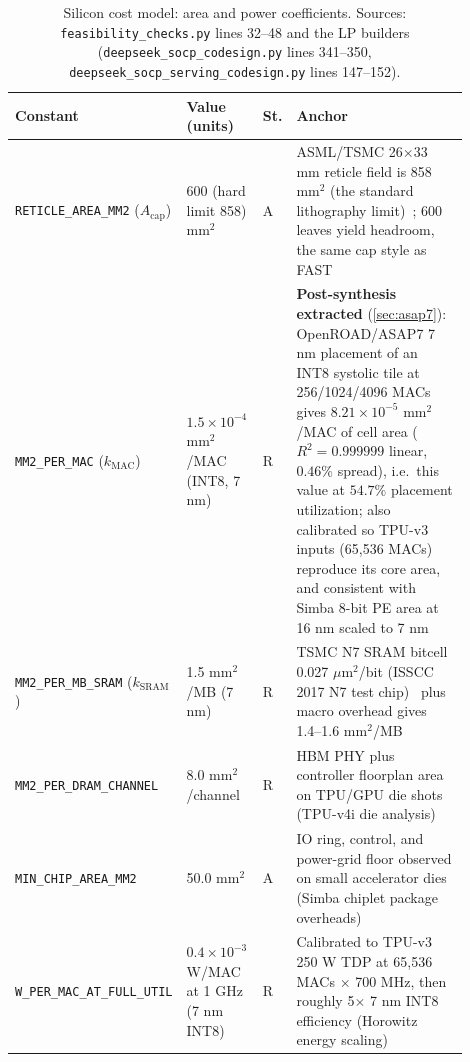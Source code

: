 \begin{table}[!htb]
\centering
\caption{Silicon cost model: area and power coefficients. Sources: \texttt{feasibility\_\allowbreak checks.py} lines 32--48 and the LP builders (\texttt{deepseek\_\allowbreak socp\_\allowbreak codesign.py} lines 341--350, \texttt{deepseek\_\allowbreak socp\_\allowbreak serving\_\allowbreak codesign.py} lines 147--152).}
\label{tab:coeff_cost_model}
\footnotesize\setlength{\tabcolsep}{3pt}
\begin{tabular}{@{}p{0.26\linewidth}p{0.17\linewidth}p{0.045\linewidth}p{0.42\linewidth}@{}}
\toprule
Constant & Value (units) & St. & Anchor \\
\midrule
\texttt{RETICLE\_\allowbreak AREA\_\allowbreak MM2} ($A_{\mathrm{cap}}$) & 600 (hard limit 858) $\mathrm{mm}^2$ & A & ASML/TSMC 26$\times$33 mm reticle field is 858 $\mathrm{mm}^2$ (the standard lithography limit)~\citep{asml_nxt2000i}; 600 leaves yield headroom, the same cap style as FAST \citep{zhang_fast} \\
\texttt{MM2\_\allowbreak PER\_\allowbreak MAC} ($k_{\mathrm{MAC}}$) & $1.5\times10^{-4}$ $\mathrm{mm}^2$/MAC (INT8, 7 nm) & R & \textbf{Post-synthesis extracted} (\cref{sec:asap7}): OpenROAD/ASAP7 7 nm placement of an INT8 systolic tile at 256/1024/4096 MACs gives $8.21\times10^{-5}$ $\mathrm{mm}^2$/MAC of cell area ($R^2=0.999999$ linear, $0.46\%$ spread), i.e.\ this value at $54.7\%$ placement utilization; also calibrated so TPU-v3 inputs (65{,}536 MACs) reproduce its core area, and consistent with Simba 8-bit PE area at 16 nm scaled to 7 nm \citep{shao2019simba} \\
\texttt{MM2\_\allowbreak PER\_\allowbreak MB\_\allowbreak SRAM} ($k_{\mathrm{SRAM}}$) & 1.5 $\mathrm{mm}^2$/MB (7 nm) & R & TSMC N7 SRAM bitcell 0.027 $\mu\mathrm{m}^2$/bit (ISSCC 2017 N7 test chip)~\citep{chang2017sram7nm} plus macro overhead gives 1.4--1.6 $\mathrm{mm}^2$/MB \\
\texttt{MM2\_\allowbreak PER\_\allowbreak DRAM\_\allowbreak CHANNEL} & 8.0 $\mathrm{mm}^2$/channel & R & HBM PHY plus controller floorplan area on TPU/GPU die shots (TPU-v4i die analysis) \citep{jouppi2021ten} \\
\texttt{MIN\_\allowbreak CHIP\_\allowbreak AREA\_\allowbreak MM2} & 50.0 $\mathrm{mm}^2$ & A & IO ring, control, and power-grid floor observed on small accelerator dies (Simba chiplet package overheads) \citep{shao2019simba} \\
\texttt{W\_\allowbreak PER\_\allowbreak MAC\_\allowbreak AT\_\allowbreak FULL\_\allowbreak UTIL} & $0.4\times10^{-3}$ W/MAC at 1 GHz (7 nm INT8) & R & Calibrated to TPU-v3 250 W TDP at 65{,}536 MACs $\times$ 700 MHz, then roughly 5$\times$ 7 nm INT8 efficiency (Horowitz energy scaling) \citep{jouppi2021ten,horowitz2014energy} \\

\end{tabular}
\end{table}
